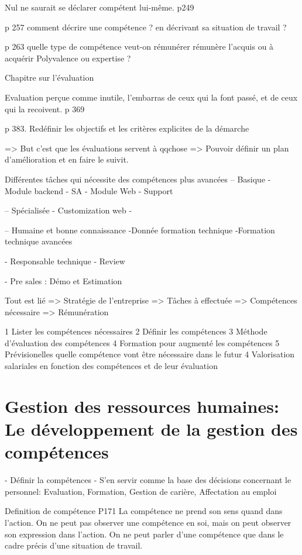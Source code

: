 Nul ne saurait se déclarer compétent lui-même. p249

p 257 comment décrire une compétence ? en décrivant sa situation de travail ? 

p 263 quelle type de compétence veut-on rémunérer
rémunère l'acquis ou à acquérir
Polyvalence ou expertise ? 

Chapitre sur l'évaluation

Evaluation perçue comme inutile, l'embarras de ceux qui la font passé, et de ceux qui la recoivent. p 369

p 383. Redéfinir les objectifs et les critères explicites de la démarche

=> But c'est que les évaluations servent à qqchose
=> Pouvoir définir un plan d'amélioration et en faire le suivit.


Différentes tâches qui nécessite des compétences plus avancées
-- Basique
- Module backend
- SA
- Module Web
- Support

-- Spécialisée
- Customization web 
- 


-- Humaine et bonne connaissance
-Donnée formation technique
-Formation technique avancées

- Responsable technique
- Review

- Pre sales : Démo et Estimation


Tout est lié => Stratégie de l'entreprise => Tâches à effectuée => Compétences nécessaire => Rémunération


1 Lister les compétences nécessaires
2 Définir les compétences 
3 Méthode d'évaluation des compétences
4 Formation pour augmenté les compétences
5 Prévisionelles quelle compétence vont être nécessaire dans le futur
4 Valorisation salariales en fonction des compétences et de leur évaluation






\section{Gestion des ressources humaines: Le développement de la gestion des compétences}

- Définir la compétences
- S'en servir comme la base des décisions concernant le personnel: Evaluation, Formation, Gestion de carière, Affectation au emploi

Definition de compétence  P171
La compétence ne prend son sens quand dans l'action. On ne peut pas observer une compétence en soi, mais on peut observer son expression dans l'action. On ne peut parler d'une compétence que dans le cadre précis d'une situation de travail.  

